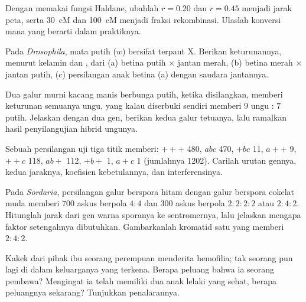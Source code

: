 \begin{exercise}[$\star\star$]\label{exo:b2:meiosis-heredity:7}
Dengan memakai fungsi Haldane, ubahlah $r = 0.20$ dan $r = 0.45$
menjadi jarak peta, serta \qty{30}{cM} dan \qty{100}{cM} menjadi fraksi
rekombinasi. Ulaslah konversi mana yang berarti dalam praktiknya.
\end{exercise}

\begin{exercise}[$\star\star$]\label{exo:b2:meiosis-heredity:8}
Pada \emph{Drosophila}, mata putih ($w$) bersifat  terpaut X.
Berikan keturunannya, menurut kelamin dan , dari (a) betina
putih $\times$ jantan merah, (b) betina merah  $\times$
jantan putih, (c) persilangan anak betina (a) dengan saudara jantannya.
\end{exercise}

\begin{exercise}[$\star\star$]\label{exo:b2:meiosis-heredity:9}
Dua galur murni kacang manis berbunga putih, ketika disilangkan,
memberi keturunan semuanya ungu, yang kalau diserbuki sendiri memberi
$9$ ungu : $7$ putih. Jelaskan dengan dua gen, berikan  kedua
galur tetuanya, lalu ramalkan hasil penyilangujian hibrid ungunya.
\end{exercise}

\begin{exercise}[$\star\star\star$]\label{exo:b2:meiosis-heredity:10}
Sebuah persilangan uji tiga titik memberi: $+++$ 480, $abc$ 470, $+bc$
11, $a++$ 9, $++c$ 118, $ab+$ 112, $+b+$ 1, $a+c$ 1 (jumlahnya 1202).
Carilah urutan gennya, kedua jaraknya, koefisien kebetulannya, dan
interferensinya.
\end{exercise}

\begin{exercise}[$\star\star\star$]\label{exo:b2:meiosis-heredity:11}
Pada \emph{Sordaria}, persilangan galur berspora hitam dengan galur
berspora cokelat muda memberi $700$ askus berpola $4 : 4$ dan $300$
askus berpola $2 : 2 : 2 : 2$ atau $2 : 4 : 2$. Hitunglah jarak dari
gen warna sporanya ke sentromernya, lalu jelaskan mengapa faktor
setengahnya dibutuhkan. Gambarkanlah kromatid satu  yang
memberi $2 : 4 : 2$.
\end{exercise}

\begin{exercise}[$\star\star\star$]\label{exo:b2:meiosis-heredity:12}
Kakek dari pihak ibu seorang perempuan menderita hemofilia; tak seorang
pun lagi di dalam keluarganya yang terkena. Berapa peluang bahwa ia
seorang pembawa? Mengingat ia telah memiliki dua anak lelaki yang
sehat, berapa peluangnya sekarang? Tunjukkan penalarannya.
\end{exercise}

